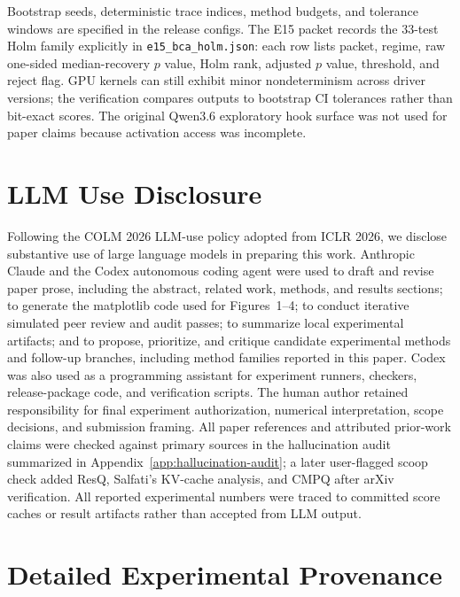 \documentclass{article}
\begin{document}
Bootstrap seeds, deterministic trace indices, method budgets, and tolerance windows are specified in the release configs. The E15 packet records the 33-test Holm family explicitly in \texttt{e15\_bca\_holm.json}: each row lists packet, regime, raw one-sided median-recovery $p$ value, Holm rank, adjusted $p$ value, threshold, and reject flag. GPU kernels can still exhibit minor nondeterminism across driver versions; the verification compares outputs to bootstrap CI tolerances rather than bit-exact scores. The original Qwen3.6 exploratory hook surface was not used for paper claims because activation access was incomplete.

\section*{LLM Use Disclosure}
Following the COLM 2026 LLM-use policy adopted from ICLR 2026, we disclose substantive use of large language models in preparing this work. Anthropic Claude and the Codex autonomous coding agent were used to draft and revise paper prose, including the abstract, related work, methods, and results sections; to generate the matplotlib code used for Figures~1--4; to conduct iterative simulated peer review and audit passes; to summarize local experimental artifacts; and to propose, prioritize, and critique candidate experimental methods and follow-up branches, including method families reported in this paper. Codex was also used as a programming assistant for experiment runners, checkers, release-package code, and verification scripts. The human author retained responsibility for final experiment authorization, numerical interpretation, scope decisions, and submission framing. All paper references and attributed prior-work claims were checked against primary sources in the hallucination audit summarized in Appendix~\ref{app:hallucination-audit}; a later user-flagged scoop check added ResQ, Salfati's KV-cache analysis, and CMPQ after arXiv verification. All reported experimental numbers were traced to committed score caches or result artifacts rather than accepted from LLM output.

\appendix

\section{Detailed Experimental Provenance}
\label{app:provenance}
\end{document}
